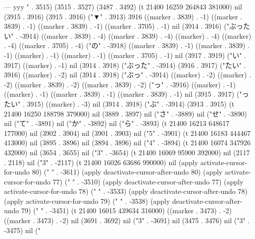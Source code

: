 ---
yyy
" . 3515) (3515 . 3527) (3487 . 3492) (t 21400 16259 264843 381000) nil (3915 . 3916) (3915 . 3916) ("▼" . 3913) 3916 ((marker . 3839) . -1) ((marker . 3839) . -1) ((marker . 3839) . -1) ((marker . 3705) . -1) nil (3914 . 3916) ("ぶったい" . -3914) ((marker . 3839) . -4) ((marker . 3839) . -4) ((marker) . -4) ((marker) . -4) ((marker . 3705) . -4) ("の" . -3918) ((marker . 3839) . -1) ((marker . 3839) . -1) ((marker) . -1) ((marker) . -1) ((marker . 3705) . -1) nil (3917 . 3919) ("い" . 3917) ((marker) . -1) nil (3914 . 3918) ("ぶった" . -3914) (3916 . 3917) ("たい" . 3916) ((marker) . -2) nil (3914 . 3918) ("ぶっ" . -3914) ((marker) . -2) ((marker) . -2) ((marker . 3839) . -2) ((marker . 3839) . -2) ("っ" . -3916) ((marker) . -1) ((marker) . -1) ((marker . 3839) . -1) ((marker . 3839) . -1) nil (3915 . 3917) ("ったい" . 3915) ((marker) . -3) nil (3914 . 3918) ("ぶ" . -3914) (3913 . 3915) (t 21400 16250 188798 379000) nil (3889 . 3897) nil ("さ" . -3889) nil ("せ" . -3890) nil ("て" . -3891) nil ("か" . -3892) nil ("ら" . -3893) (t 21400 16213 648617 177000) nil (3902 . 3904) nil (3901 . 3903) nil ("5" . -3901) (t 21400 16183 444467 413000) nil (3895 . 3896) nil (3894 . 3896) nil ("4" . -3894) (t 21400 16074 347926 432000) nil (3654 . 3655) nil ("3" . -3654) (t 21400 16069 95900 392000) nil (2117 . 2118) nil ("3" . -2117) (t 21400 16026 63686 990000) nil (apply activate-cursor-for-undo 80) ("  " . -3611) (apply deactivate-cursor-after-undo 80) (apply activate-cursor-for-undo 77) ("  " . -3510) (apply deactivate-cursor-after-undo 77) (apply activate-cursor-for-undo 78) ("  " . -3533) (apply deactivate-cursor-after-undo 78) (apply activate-cursor-for-undo 79) ("  " . -3538) (apply deactivate-cursor-after-undo 79) ("  " . -3451) (t 21400 16015 439634 316000) ((marker . 3473) . -2) ((marker . 3473) . -2) nil (3691 . 3692) nil ("3" . -3691) nil (3475 . 3476) nil ("3" . -3475) nil ("%